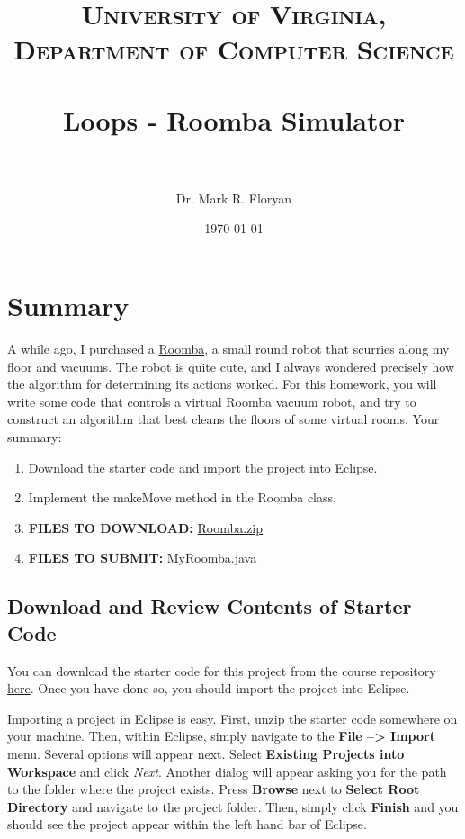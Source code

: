\documentclass[paper=a4, fontsize=11pt, parskip=full]{scrartcl} %
\title{
\normalfont \normalsize
\textsc{University of Virginia, Department of Computer Science} \\ [25pt] %
\horrule{0.5pt} \\[0.4cm] %
\huge Loops - Roomba Simulator \\ %
\horrule{2pt} \\[0.5cm] %
}
\author{Dr. Mark R. Floryan} %
\date{\normalsize\today} %
\numberwithin{equation}{section} %
\numberwithin{figure}{section} %
\numberwithin{table}{section} %
\begin{document}
\maketitle %


\section{Summary}

A while ago, I purchased a \href{https://www.irobot.com/For-the-Home/Vacuuming/Roomba.aspx}{Roomba}, a small round robot that scurries along my floor and vacuums. The robot is quite cute, and I always wondered precisely how the algorithm for determining its actions worked. For this homework, you will write some code that controls a virtual Roomba vacuum robot, and try to construct an algorithm that best cleans the floors of some virtual rooms. Your summary:

\begin{enumerate}
	\item Download the starter code and import the project into Eclipse.
	\item Implement the makeMove method in the Roomba class.
	\item \textbf{FILES TO DOWNLOAD:} \href{https://markfloryan.github.io/dsa1/homeworks/Loops/code/Roomba.zip}{Roomba.zip}
	\item \textbf{FILES TO SUBMIT:} MyRoomba.java
\end{enumerate}


\subsection{Download and Review Contents of Starter Code}

You can download the starter code for this project from the course repository \href{https://markfloryan.github.io/dsa1/homeworks/Loops/code/Roomba.zip}{here}. Once you have done so, you should import the project into Eclipse.

Importing a project in Eclipse is easy. First, unzip the starter code somewhere on your machine. Then, within Eclipse, simply navigate to the \textbf{File --> Import} menu. Several options will appear next. Select \textbf{Existing Projects into Workspace} and click \emph{Next}. Another dialog will appear asking you for the path to the folder where the project exists. Press \textbf{Browse} next to \textbf{Select Root Directory} and navigate to the project folder. Then, simply click \textbf{Finish} and you should see the project appear within the left hand bar of Eclipse.
\end{document}
